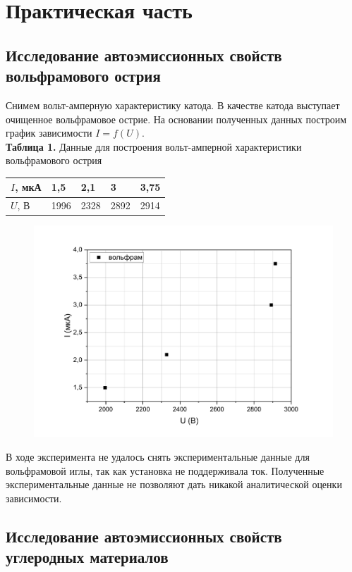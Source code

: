 \documentclass[12pt,a4paper]{article}
\begin{document}
\section{Практическая часть}

\subsection{Исследование автоэмиссионных свойств вольфрамового острия}
Снимем вольт-амперную характеристику катода. В качестве катода выступает очищенное вольфрамовое острие. На основании полученных данных построим график зависимости $I = f(U)$.\\
\textbf{Таблица 1. }Данные для построения вольт-амперной характеристики вольфрамового острия
\begin{table}[h!]
\begin{tabular}{|l|l|l|l|l|}
\hline
$I$, мкА & 1,5  & 2,1  & 3    & 3,75 \\ \hline
$U$, В   & 1996 & 2328 & 2892 & 2914 \\ \hline
\end{tabular}
\end{table}
\begin{figure}[H]
\centering
	\includegraphics[width=0.65\linewidth]{vakh_volfram.pdf}
\end{figure}

В ходе эксперимента не удалось снять экспериментальные данные для вольфрамовой иглы, так как установка не поддерживала ток. Полученные экспериментальные данные не позволяют дать никакой аналитической оценки зависимости.


\subsection{Исследование автоэмиссионных свойств углеродных материалов}
\end{document}
